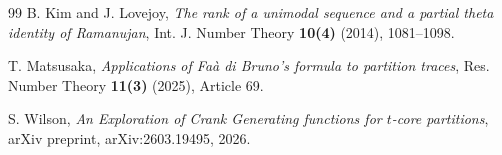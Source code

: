 \documentclass[12pt,oneside,reqno]{amsart}
\numberwithin{equation}{section}
\begin{document}
\begin{thebibliography}{99}
	B. Kim and J. Lovejoy, \emph{The rank of a unimodal sequence and a partial theta identity of Ramanujan},
	Int. J. Number Theory \textbf{10(4)} (2014), 1081--1098.
	
	T. Matsusaka, \emph{Applications of Fa\`a di Bruno's formula to partition traces},
	Res. Number Theory \textbf{11(3)} (2025), Article 69.
	
	S. Wilson,
	\emph{An Exploration of Crank Generating functions for $t$-core partitions},
	arXiv preprint, arXiv:2603.19495, 2026.
		
	\end{thebibliography}
\end{document}
